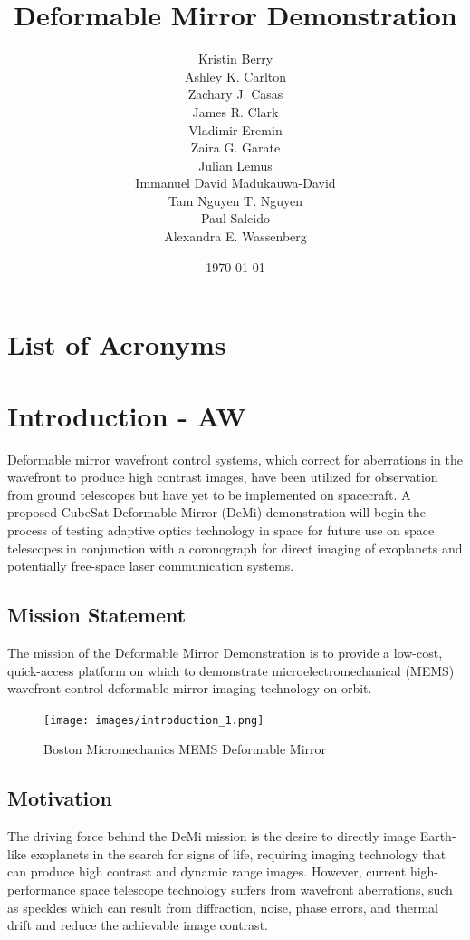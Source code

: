 \documentclass[12pt]{article}
\title{Deformable Mirror Demonstration}
\author{Kristin Berry\\
Ashley K. Carlton\\
Zachary J. Casas\\
James R. Clark\\
Vladimir Eremin\\ 
Zaira G. Garate\\ 
Julian Lemus\\
Immanuel David Madukauwa-David\\
Tam Nguyen T. Nguyen\\
Paul Salcido\\
Alexandra E. Wassenberg 
}
\date{\today}
\begin{document}
\maketitle
\newpage

\tableofcontents
\listoffigures
\listoftables


\section*{List of Acronyms}
\begin{acronym}


\end{acronym}
\newpage

\section{Introduction - AW}
Deformable mirror wavefront control systems, which correct for aberrations in the wavefront to produce high contrast images, have been utilized for observation from ground telescopes but have yet to be implemented on spacecraft.  A proposed CubeSat Deformable Mirror (DeMi) demonstration will begin the process of testing adaptive optics technology in space for future use on space telescopes in conjunction with a coronograph for direct imaging of exoplanets and potentially free-space laser communication systems.

\subsection{Mission Statement}
The mission of the Deformable Mirror Demonstration is to provide a low-cost, quick-access platform on which to demonstrate microelectromechanical (MEMS) wavefront control deformable mirror imaging technology on-orbit.

\begin{figure}[!ht]
\centering
\texttt{[image: images/introduction\_1.png]}
\caption{Boston Micromechanics MEMS Deformable Mirror}
\label{fig:Intro_demi}
\end{figure}
\subsection{Motivation}
The driving force behind the DeMi mission is the desire to directly image Earth-like exoplanets in the search for signs of life, requiring imaging technology that can produce high contrast and dynamic range images.  However, current high-performance space telescope technology suffers from wavefront aberrations, such as speckles which can result from diffraction, noise, phase errors, and thermal drift and reduce the achievable image contrast.   
\end{document}
